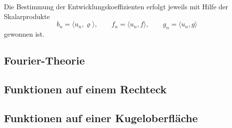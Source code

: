 Die Bestimmung der Entwicklungskoeffizienten erfolgt jeweils mit Hilfe
der Skalarprodukte
\[
b_n = \langle u_n, \varrho\rangle,
\qquad
f_n = \langle u_n, f\rangle,
\qquad
g_n = \langle u_n, g\rangle
\]
gewonnen ist.

%
%
\subsection{Fourier-Theorie}

%
%
\subsection{Funktionen auf einem Rechteck}

%
%
%
\subsection{Funktionen auf einer Kugeloberfläche}

